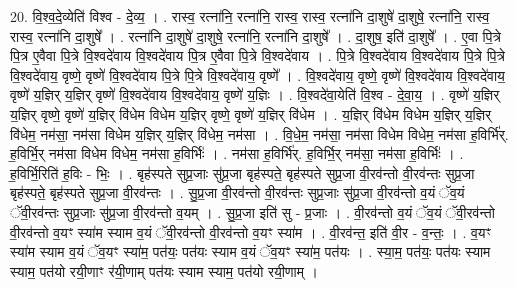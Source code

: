 \documentclass[17pt]{extarticle}
\begin{document}
20. वि॒श्व॒दे॒व्येति॑ विश्व - दे॒व्य॒ । . रास्व॒ रत्ना॑नि॒ रत्ना॑नि॒ रास्व॒ रास्व॒ रत्ना॑नि दा॒शुषे॑ दा॒शुषे॒ रत्ना॑नि॒ रास्व॒ रास्व॒ रत्ना॑नि दा॒शुषे᳚ । . रत्ना॑नि दा॒शुषे॑ दा॒शुषे॒ रत्ना॑नि॒ रत्ना॑नि दा॒शुषे᳚ । . दा॒शुष॒ इति॑ दा॒शुषे᳚ । . ए॒वा पि॒त्रे पि॒त्र ए॒वैवा पि॒त्रे वि॒श्वदे॑वाय वि॒श्वदे॑वाय पि॒त्र ए॒वैवा पि॒त्रे वि॒श्वदे॑वाय । . पि॒त्रे वि॒श्वदे॑वाय वि॒श्वदे॑वाय पि॒त्रे पि॒त्रे वि॒श्वदे॑वाय॒ वृष्णे॒ वृष्णे॑ वि॒श्वदे॑वाय पि॒त्रे पि॒त्रे वि॒श्वदे॑वाय॒ वृष्णे᳚ । . वि॒श्वदे॑वाय॒ वृष्णे॒ वृष्णे॑ वि॒श्वदे॑वाय वि॒श्वदे॑वाय॒ वृष्णे॑ य॒ज्ञिर् य॒ज्ञिर् वृष्णे॑ वि॒श्वदे॑वाय वि॒श्वदे॑वाय॒ वृष्णे॑ य॒ज्ञिः । . वि॒श्वदे॑वा॒येति॑ वि॒श्व - दे॒वा॒य॒ । . वृष्णे॑ य॒ज्ञिर् य॒ज्ञिर् वृष्णे॒ वृष्णे॑ य॒ज्ञिर् वि॑धेम विधेम य॒ज्ञिर् वृष्णे॒ वृष्णे॑ य॒ज्ञिर् वि॑धेम । . य॒ज्ञिर् वि॑धेम विधेम य॒ज्ञिर् य॒ज्ञिर् वि॑धेम॒ नम॑सा॒ नम॑सा विधेम य॒ज्ञिर् य॒ज्ञिर् वि॑धेम॒ नम॑सा । . वि॒धे॒म॒ नम॑सा॒ नम॑सा विधेम विधेम॒ नम॑सा ह॒विर्भि॑र्. ह॒विर्भि॒र् नम॑सा विधेम विधेम॒ नम॑सा ह॒विर्भिः॑ । . नम॑सा ह॒विर्भि॑र्. ह॒विर्भि॒र् नम॑सा॒ नम॑सा ह॒विर्भिः॑ । . ह॒विर्भि॒रिति॑ ह॒विः - भिः॒ । . बृह॑स्पते सुप्र॒जाः सु॑प्र॒जा बृह॑स्पते॒ बृह॑स्पते सुप्र॒जा वी॒रव॑न्तो वी॒रव॑न्तः सुप्र॒जा बृह॑स्पते॒ बृह॑स्पते सुप्र॒जा वी॒रव॑न्तः । . सु॒प्र॒जा वी॒रव॑न्तो वी॒रव॑न्तः सुप्र॒जाः सु॑प्र॒जा वी॒रव॑न्तो व॒यं ॅव॒यं ॅवी॒रव॑न्तः सुप्र॒जाः सु॑प्र॒जा वी॒रव॑न्तो व॒यम् । . सु॒प्र॒जा इति॑ सु - प्र॒जाः । . वी॒रव॑न्तो व॒यं ॅव॒यं ॅवी॒रव॑न्तो वी॒रव॑न्तो व॒यꣳ स्या॑म स्याम व॒यं ॅवी॒रव॑न्तो वी॒रव॑न्तो व॒यꣳ स्या॑म । . वी॒रव॑न्त॒ इति॑ वी॒र - व॒न्तः॒ । . व॒यꣳ स्या॑म स्याम व॒यं ॅव॒यꣳ स्या॑म॒ पत॑यः॒ पत॑यः स्याम व॒यं ॅव॒यꣳ स्या॑म॒ पत॑यः । . स्या॒म॒ पत॑यः॒ पत॑यः स्याम स्याम॒ पत॑यो रयी॒णाꣳ र॑यी॒णाम् पत॑यः स्याम स्याम॒ पत॑यो रयी॒णाम् । \newline
\end{document}

